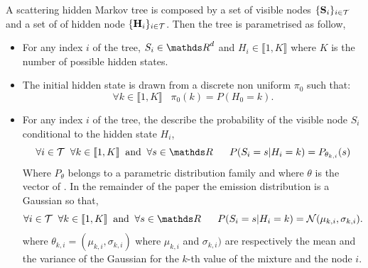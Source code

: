 \documentclass[a4paper,11pt]{report}
\begin{document}
	  A scattering hidden Markov tree is composed by a set of visible nodes $\{{\bf S}_{i}\}_{i \in \mathcal{T}}$ and a set of of hidden node $\{{\bf H}_{i}\}_{i \in \mathcal{T}}$. Then the tree is parametrised as follow,
	  
    \begin{itemize}
      \item For any index $i$ of the tree, $S_{i} \in \dsR^{d}$ and $H_{i} \in \llbracket 1,K \rrbracket$ where $K$ is the number of possible hidden states.
      
      \item The initial hidden state is drawn from a discrete non uniform  $\pi_{0}$ such that:
	  	  \begin{equation}
					\forall k \in \llbracket 1,K \rrbracket \;\;\; \pi_{0}(k) = P(H_{0}=k).
					\label{eq:SCHMT - initial distribution}
				\end{equation}
				
      \item For any index $i$ of the tree, the  describe the probability of the visible node $S_{i}$ conditional to the hidden state $H_{i}$,
				\begin{equation}
				  \forall i \in \mcalT \;\; \forall k \in \llbracket1,K\rrbracket \;\; \text{and} \;\; \forall s \in \dsR
					\;\;\;\;\;\;P(S_{i}=s|H_{i}=k) = P_{\theta_{k,i}}(s)
					\label{eq:SCHMT - Emission distr}
				\end{equation}
				Where $P_{\theta}$ belongs to a parametric distribution family and where $\theta$ is the vector of . In the remainder of the paper the emission distribution is a Gaussian so that,  
      	\begin{equation}
				  \forall i \in \mcalT \;\; \forall k \in \llbracket1,K\rrbracket \;\; \text{and} \;\; \forall s \in \dsR
					\;\;\;\;\;\; P(S_{i}=s | H_{i}=k) = \mcalN(\mu_{k,i},\sigma_{k,i}).
				  \label{eq:SCHMT - Mixt of Gaussian}
				\end{equation}
				where $\theta_{k,i}=(\mu_{k,i},\sigma_{k,i})$ where $\mu_{k,i}$ and $\sigma_{k,i})$ are respectively the mean and the variance of the Gaussian for the $k$-th value of the mixture and the node $i$.
				

\end{itemize}
\end{document}
